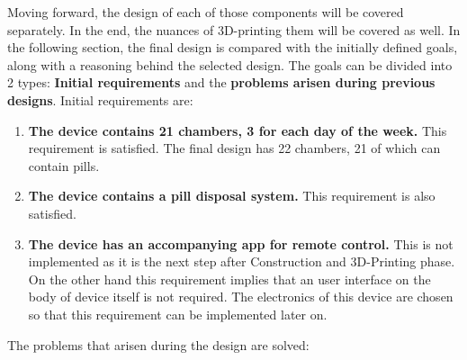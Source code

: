 Moving forward, the design of each of those components will be covered separately. In the end, the nuances of 3D-printing them will be covered as well. In the following section, the final design is compared with the initially defined goals, along with a reasoning behind the selected design. The goals can be divided into 2 types: \textbf{Initial requirements} and the \textbf{problems arisen during previous designs}. Initial requirements are:
\begin{enumerate}
	\item{\textbf{The device contains 21 chambers, 3 for each day of the week.}} This requirement is satisfied. The final design has 22 chambers, 21 of which can contain pills.
	\item{\textbf{The device contains a pill disposal system.}} This requirement is also satisfied. 
	\item{\textbf{The device has an accompanying app for remote control.}} This is not implemented as it is the next step after Construction and 3D-Printing phase. On the other hand this requirement implies that an user interface on the body of device itself is not required. The electronics of this device are chosen so that this requirement can be implemented later on.
\end{enumerate}
The problems that arisen during the design are solved:
